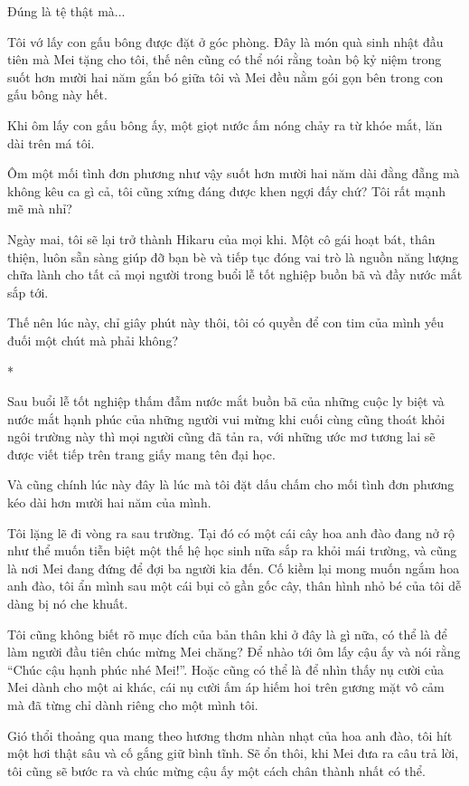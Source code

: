 {Đúng là tệ thật mà...

Tôi vớ lấy con gấu bông được đặt ở góc phòng. Đây là món quà sinh nhật
đầu tiên mà Mei tặng cho tôi, thế nên cũng có thể nói rằng toàn bộ kỷ
niệm trong suốt hơn mười hai năm gắn bó giữa tôi và Mei đều nằm gói gọn
bên trong con gấu bông này hết.

Khi ôm lấy con gấu bông ấy, một giọt nước ấm nóng chảy ra từ khóe mắt,
lăn dài trên má tôi.

Ôm một mối tình đơn phương như vậy suốt hơn mười hai năm dài đằng đẵng
mà không kêu ca gì cả, tôi cũng xứng đáng được khen ngợi đấy chứ? Tôi
rất mạnh mẽ mà nhỉ?

Ngày mai, tôi sẽ lại trở thành Hikaru của mọi khi. Một cô gái hoạt bát,
thân thiện, luôn sẵn sàng giúp đỡ bạn bè và tiếp tục đóng vai trò là
nguồn năng lượng chữa lành cho tất cả mọi người trong buổi lễ tốt nghiệp
buồn bã và đầy nước mắt sắp tới.

Thế nên lúc này, chỉ giây phút này thôi, tôi có quyền để con tim của
mình yếu đuối một chút mà phải không?

*

Sau buổi lễ tốt nghiệp thấm đẫm nước mắt buồn bã của những cuộc ly biệt
và nước mắt hạnh phúc của những người vui mừng khi cuối cùng cũng thoát
khỏi ngôi trường này thì mọi người cũng đã tản ra, với những ước mơ
tương lai sẽ được viết tiếp trên trang giấy mang tên đại học.

Và cũng chính lúc này đây là lúc mà tôi đặt dấu chấm cho mối tình đơn
phương kéo dài hơn mười hai năm của mình.

Tôi lặng lẽ đi vòng ra sau trường. Tại đó có một cái cây hoa anh đào
đang nở rộ như thể muốn tiễn biệt một thế hệ học sinh nữa sắp ra khỏi
mái trường, và cũng là nơi Mei đang đứng để đợi ba người kia đến. Cố
kiềm lại mong muốn ngắm hoa anh đào, tôi ẩn mình sau một cái bụi cỏ gần
gốc cây, thân hình nhỏ bé của tôi dễ dàng bị nó che khuất.

Tôi cũng không biết rõ mục đích của bản thân khi ở đây là gì nữa, có thể
là để làm người đầu tiên chúc mừng Mei chăng? Để nhào tới ôm lấy cậu ấy
và nói rằng ``Chúc cậu hạnh phúc nhé Mei!''. Hoặc cũng có thể là để nhìn
thấy nụ cười của Mei dành cho một ai khác, cái nụ cười ấm áp hiếm hoi
trên gương mặt vô cảm mà đã từng chỉ dành riêng cho một mình tôi.

Gió thổi thoảng qua mang theo hương thơm nhàn nhạt của hoa anh đào, tôi
hít một hơi thật sâu và cố gắng giữ bình tĩnh. Sẽ ổn thôi, khi Mei đưa
ra câu trả lời, tôi cũng sẽ bước ra và chúc mừng cậu ấy một cách chân
thành nhất có thể.

}

